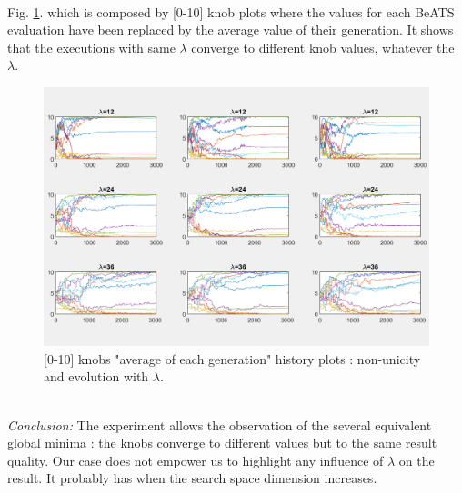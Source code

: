 \\
Fig. \ref{fig:lambdaknobsgenmean}. which is composed by [0-10] knob plots where the values for each BeATS evaluation have been replaced by the average value of their generation. It shows that the executions with same $\lambda$ converge to different knob values, whatever the $\lambda$. 
\begin{figure}[h]
	\label{fig:lambdaknobsgenmean}
	\caption{[0-10] knobs "average of each generation" history plots : non-unicity and evolution with $\lambda$.}
	\includegraphics[width=7in]{figures/results_figures/lambda/knobs_lambda_all_genmean.png}
\end{figure}
\\
\emph{Conclusion:} The experiment allows the observation of the several equivalent global minima : the knobs converge to different values but to the same result quality. Our case does not empower us to highlight any influence of $\lambda$ on the result. It probably has when the search space dimension increases.